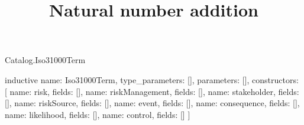 \begin{lexlean}{Catalog.Iso31000Term}
\title{Natural number addition}
\begin{semanticmodule}
inductive{
  name: Iso31000Term,
  type_parameters: [],
  parameters: [],
  constructors: [
    {name: risk, fields: []},
    {name: riskManagement, fields: []},
    {name: stakeholder, fields: []},
    {name: riskSource, fields: []},
    {name: event, fields: []},
    {name: consequence, fields: []},
    {name: likelihood, fields: []},
    {name: control, fields: []}
  ]
}
\end{semanticmodule}
\end{lexlean}
